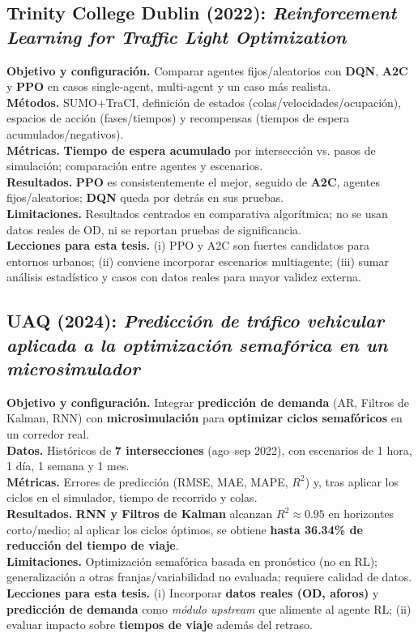\subsection*{Trinity College Dublin (2022): \textit{Reinforcement Learning for Traffic Light Optimization} \citep{Chakrabarti2022}}
\textbf{Objetivo y configuración.} Comparar agentes fijos/aleatorios con \textbf{DQN}, \textbf{A2C} y \textbf{PPO} en casos single-agent, multi-agent y un caso más realista. \\
\textbf{Métodos.} SUMO+TraCI, definición de estados (colas/velocidades/ocupación), espacios de acción (fases/tiempos) y recompensas (tiempos de espera acumulados/negativos). \\
\textbf{Métricas.} \textbf{Tiempo de espera acumulado} por intersección vs. pasos de simulación; comparación entre agentes y escenarios. \\
\textbf{Resultados.} \textbf{PPO} es consistentemente el mejor, seguido de \textbf{A2C}, agentes fijos/aleatorios; \textbf{DQN} queda por detrás en sus pruebas. \\
\textbf{Limitaciones.} Resultados centrados en comparativa algorítmica; no se usan datos reales de OD, ni se reportan pruebas de significancia. \\
\textbf{Lecciones para esta tesis.} (i) PPO y A2C son fuertes candidatos para entornos urbanos; (ii) conviene incorporar escenarios multiagente; (iii) sumar análisis estadístico y casos con datos reales para mayor validez externa.

\subsection*{UAQ (2024): \textit{Predicción de tráfico vehicular aplicada a la optimización semafórica en un microsimulador} \citep{UAQ2024}}
\textbf{Objetivo y configuración.} Integrar \textbf{predicción de demanda} (AR, Filtros de Kalman, RNN) con \textbf{microsimulación} para \textbf{optimizar ciclos semafóricos} en un corredor real. \\
\textbf{Datos.} Históricos de \textbf{7 intersecciones} (ago–sep 2022), con escenarios de 1 hora, 1 día, 1 semana y 1 mes. \\
\textbf{Métricas.} Errores de predicción (RMSE, MAE, MAPE, $R^2$) y, tras aplicar los ciclos en el simulador, tiempo de recorrido y colas. \\
\textbf{Resultados.} \textbf{RNN y Filtros de Kalman} alcanzan \textbf{$R^2\approx 0.95$} en horizontes corto/medio; al aplicar los ciclos óptimos, se obtiene \textbf{hasta 36.34\% de reducción del tiempo de viaje}. \\
\textbf{Limitaciones.} Optimización semafórica basada en pronóstico (no en RL); generalización a otras franjas/variabilidad no evaluada; requiere calidad de datos. \\
\textbf{Lecciones para esta tesis.} (i) Incorporar \textbf{datos reales (OD, aforos)} y \textbf{predicción de demanda} como \textit{módulo upstream} que alimente al agente RL; (ii) evaluar impacto sobre \textbf{tiempos de viaje} además del retraso.

